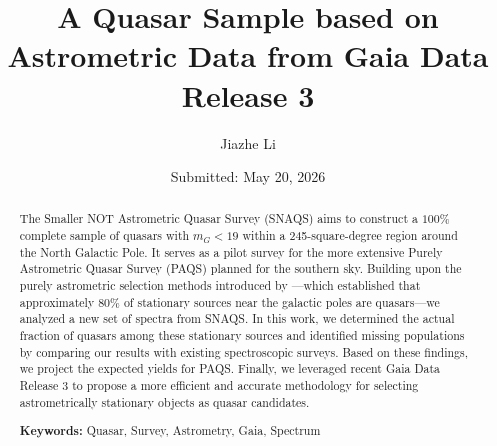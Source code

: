 \documentclass[12pt, a4paper]{memoir}
\author{Jiazhe Li}
\title{A Quasar Sample based on Astrometric Data from Gaia Data Release 3}
\subtitle{}
\date{Submitted: May 20, 2026}
\begin{document}
\begingroup
  \selectfont
  \maketitle
\endgroup

\frontmatter
\begin{abstract}

    The Smaller NOT Astrometric Quasar Survey (SNAQS) aims to construct a $100\%$ complete sample of quasars with $m_G < 19$ within a 245-square-degree region around the North Galactic Pole. It serves as a pilot survey for the more extensive Purely Astrometric Quasar Survey (PAQS) planned for the southern sky. Building upon the purely astrometric selection methods introduced by \citet{heintz_study_2015}—which established that approximately $80\%$ of stationary sources near the galactic poles are quasars—we analyzed a new set of spectra from SNAQS. In this work, we determined the actual fraction of quasars among these stationary sources and identified missing populations by comparing our results with existing spectroscopic surveys. Based on these findings, we project the expected yields for PAQS. Finally, we leveraged recent Gaia Data Release 3 to propose a more efficient and accurate methodology for selecting astrometrically stationary objects as quasar candidates.

    \vspace{1em}
    \noindent \textbf{Keywords:} Quasar, Survey, Astrometry, Gaia, Spectrum
    
\end{abstract}


\newpage
\tableofcontents
\newpage
\printnomenclature
{}



\mainmatter
\end{document}

